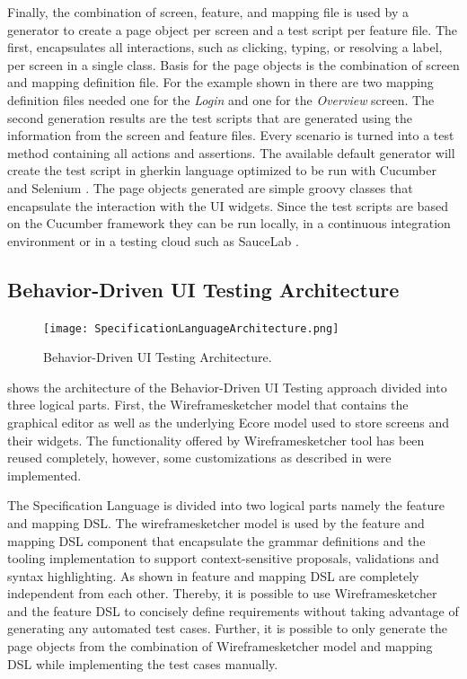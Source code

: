 \documentclass{sig-alternate-05-2015}
\begin{document}
Finally, the combination of screen, feature, and mapping file is used by a generator to create a page object per screen and a test script per feature file.
The first, encapsulates all interactions, such as clicking, typing, or resolving a label, per screen in a single class.
Basis for the page objects is the combination of screen and mapping definition file.
For the example shown in  there are two mapping definition files needed one for the \textit{Login} and one for the \textit{Overview} screen.
The second generation results are the test scripts that are generated using the information from the screen and feature files.
Every scenario is turned into a test method containing all actions and assertions.
The available default generator will create the test script in gherkin language optimized to be run with Cucumber and Selenium \cite{wynne2012cucumber}.
The page objects generated are simple groovy classes that encapsulate the interaction with the UI widgets.
Since the test scripts are based on the Cucumber framework they can be run locally, in a continuous integration environment or in a testing cloud such as SauceLab \cite{saucelab}.

\subsection{Behavior-Driven UI Testing Architecture}
\begin{figure}[h]
	\centering
	\texttt{[image: SpecificationLanguageArchitecture.png]}
	\caption{Behavior-Driven UI Testing Architecture.}
	\label{fig:architectureOverview}
\end{figure}

 shows the architecture of the Behavior-Driven UI Testing approach divided into three logical parts. 
First, the Wireframesketcher model that contains the graphical editor as well as the underlying Ecore model used to store screens and their widgets.
The functionality offered by Wireframesketcher tool has been reused completely, however, some customizations as described in  were implemented.

The Specification Language is divided into two logical parts namely the feature and mapping DSL.
The wireframesketcher model is used by the feature and mapping DSL component that encapsulate the grammar definitions and the tooling implementation to support context-sensitive proposals, validations and syntax highlighting.
As shown in  feature and mapping DSL are completely independent from each other.
Thereby, it is possible to use Wireframesketcher and the feature DSL to concisely define requirements without taking advantage of generating any automated test cases.
Further, it is possible to only generate the page objects from the combination of Wireframesketcher model and mapping DSL while implementing the test cases manually.
\end{document}
